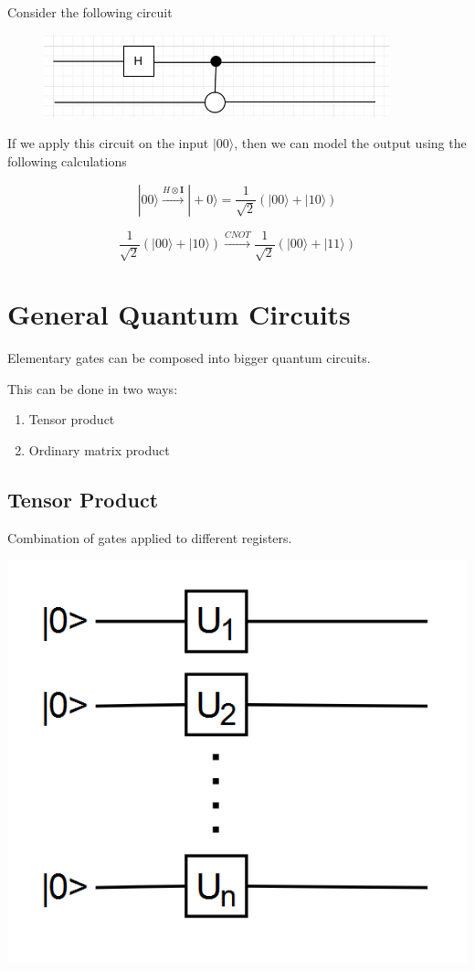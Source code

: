 \documentclass{article}
\begin{document}
Consider the following circuit

\begin{figure}[htp]
    \centering
    \includegraphics[width=10cm]{extwoqubit.png}
\end{figure}

If we apply this circuit on the input $|00\rangle$, then we can model the output using the following calculations

$$|00\rangle \xrightarrow[]{H \otimes \mathbf{I}} |+0\rangle = \frac{1}{\sqrt{2}}(|00\rangle + |10\rangle)$$

$$\frac{1}{\sqrt{2}}(|00\rangle + |10\rangle) \xrightarrow[]{CNOT} \frac{1}{\sqrt{2}}(|00\rangle + |11\rangle)$$

\section{General Quantum Circuits}
Elementary gates can be composed into bigger quantum circuits.

This can be done in two ways:
\begin{enumerate}
    \item Tensor product
    \item Ordinary matrix product
\end{enumerate}

\subsection{Tensor Product}
Combination of gates applied to different registers.

\includegraphics[scale=0.5]{q1.png}
\end{document}
